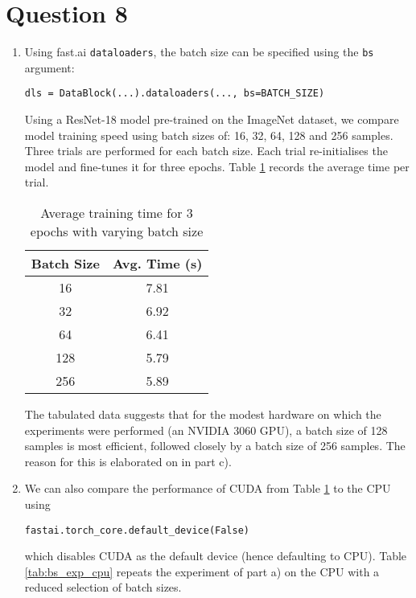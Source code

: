 \section*{Question 8}

\begin{enumerate}[label=\alph*)]

    \item Using fast.ai \texttt{dataloaders}, the batch size can be specified using the \texttt{bs} argument:
    \begin{center}
        \texttt{dls = DataBlock(...).dataloaders(..., bs=BATCH\_SIZE)}
    \end{center}
    Using a ResNet-18 model pre-trained on the ImageNet dataset, we compare model training speed using batch sizes of: 16, 32, 64, 128 and 256 samples. Three trials are performed for each batch size. Each trial re-initialises the model and fine-tunes it for three epochs. Table \ref{tab:bs_exp} records the average time per trial.

    \begin{table}[ht]
        \small \centering {}
        \caption{Average training time for 3 epochs with varying batch size}
        \begin{tabularx}{0.37\textwidth}{c c}
            \toprule
            \textbf{Batch Size} & \textbf{Avg. Time (s)} \\
            \midrule
             16 & 7.81 \\
             32 & 6.92 \\
             64 & 6.41 \\
            128 & 5.79 \\
            256 & 5.89 \\
            \bottomrule
        \end{tabularx}
        \label{tab:bs_exp}
    \end{table}

    The tabulated data suggests that for the modest hardware on which the experiments were performed (an NVIDIA 3060 GPU), a batch size of 128 samples is most efficient, followed closely by a batch size of 256 samples. The reason for this is elaborated on in part c).

    \item We can also compare the performance of CUDA from Table \ref{tab:bs_exp} to the CPU using
    \begin{center}
        \texttt{fastai.torch\_core.default\_device(False)}
    \end{center}
    which disables CUDA as the default device (hence defaulting to CPU). Table \ref{tab:bs_exp_cpu} repeats the experiment of part a) on the CPU with a reduced selection of batch sizes.


\end{enumerate}
